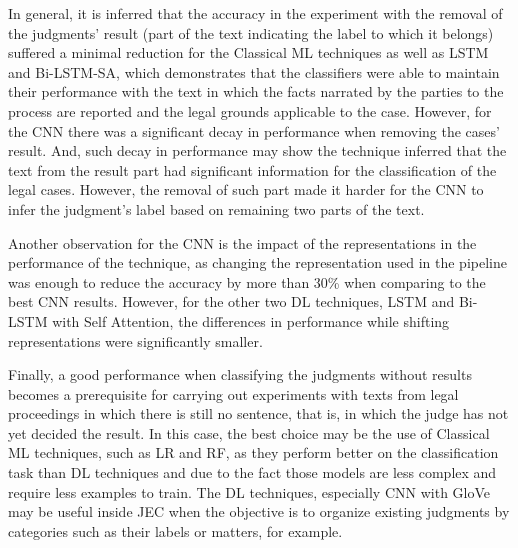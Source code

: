 % 


In general, it is inferred that the accuracy in the experiment with the removal of the judgments' result (part of the text indicating the label to which it belongs) suffered a minimal reduction for the Classical ML techniques as well as LSTM and Bi-LSTM-SA, which demonstrates that the classifiers were able to maintain their performance with the text in which the facts narrated by the parties to the process are reported and the legal grounds applicable to the case. 
However, for the CNN there was a significant decay in performance when removing the cases' result. And, such  decay in performance may show the technique inferred that the text from the result part  had significant information for the classification of the legal cases.
However, the removal of such part made it harder for the CNN to infer the judgment's label based on remaining two parts of the text. 

Another observation for the CNN is the impact of the representations in the performance of the technique, as changing the representation used in the pipeline was enough to reduce the accuracy by more than 30\% when comparing to the best CNN results. However, for the other two DL techniques, LSTM and Bi-LSTM with Self Attention, the differences in performance while shifting representations were significantly smaller.

Finally, a good performance when classifying the judgments without results becomes a prerequisite for carrying out experiments with texts from legal proceedings in which there is still no sentence, that is, in which the judge has not yet decided the result. In this case, the best choice may be the use of Classical ML techniques, such as LR and RF, as they perform better on the classification task than DL techniques and due to the fact those models are less complex and require less examples to train.
The \gls{DL} techniques, especially CNN with GloVe may be useful inside JEC when the objective is to organize existing judgments by categories such as their labels or matters, for example. 

